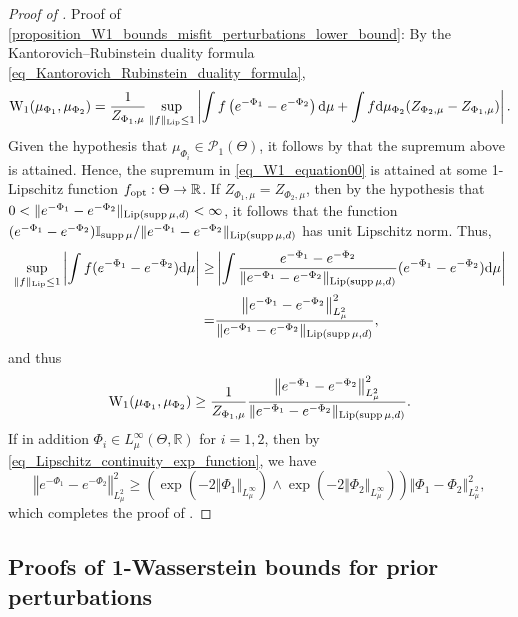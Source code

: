 \documentclass[a4paper]{scrartcl}
\theoremstyle{definition}
\numberwithin{equation}{section}
\newcommand{\R}{\mathbb{R}}
\newcommand{\rd}{\mathrm{d}}
\DeclareMathOperator{\supp}{supp}
\newcommand{\Abs}[1]{\left\vert#1\right\vert}
\newcommand{\norm}[1]{\Vert #1 \Vert}
\newcommand{\Norm}[1]{\left\Vert #1 \right\Vert}
\newcommand{\Lip}[0]{\textup{Lip}}
\newcommand{\Was}[0]{\textup{W}}
\newcommand{\opt}[0]{\textup{opt}}
\begin{document}
\begin{proof}[Proof of ]
 Proof of \cref{proposition_W1_bounds_misfit_perturbations_lower_bound}: By the Kantorovich--Rubinstein duality formula \eqref{eq_Kantorovich_Rubinstein_duality_formula}, 
 \begin{equation*}
 \Was_1(\mu_{\Phi_1},\mu_{\Phi_2})=\frac{1}{Z_{\Phi_1,\mu}}\sup_{\norm{f}_{\Lip}\leq 1}\Abs{ \int f\left(  e^{-\Phi_1}-e^{-\Phi_2}\right)\rd \mu+\int f \rd \mu_{\Phi_2}(Z_{\Phi_2,\mu}-Z_{\Phi_1,\mu}) }.
\end{equation*}
 Given the hypothesis that $\mu_{\Phi_i}\in\mathcal{P}_1(\Theta)$, it follows by  that the supremum above is attained.
 Hence, the supremum in \eqref{eq_W1_equation00} is attained at some 1-Lipschitz function $f_\opt:\Theta\to\R$.
If $Z_{\Phi_1,\mu}=Z_{\Phi_2,\mu}$, then by the hypothesis that $0<\norm{e^{-\Phi_1}-e^{-\Phi_2}}_{\Lip(\supp{\mu},d)}<\infty$, it follows that the function $(e^{-\Phi_1}-e^{-\Phi_2})\mathbb{I}_{\supp{\mu}}/\norm{e^{-\Phi_1}-e^{-\Phi_2}}_{\Lip(\supp{\mu},d)}$ has unit Lipschitz norm.
Thus,
\begin{align*}
 \sup_{\norm{f}_{\Lip}\leq 1} \Abs{ \int f (e^{-\Phi_1}-e^{-\Phi_2})\rd \mu}\geq & \Abs{ \int \frac{e^{-\Phi_1}-e^{-\Phi_2}}{\norm{e^{-\Phi_1}-e^{-\Phi_2}}_{\Lip(\supp{\mu},d)}} (e^{-\Phi_1}-e^{-\Phi_2})\rd \mu}
 \\
 =&\frac{\Norm{e^{-\Phi_1}-e^{-\Phi_2}}_{L^2_\mu}^{2}}{\norm{e^{-\Phi_1}-e^{-\Phi_2}}_{\Lip(\supp{\mu},d)}},
\end{align*}
and thus
\begin{equation*}
 \Was_1(\mu_{\Phi_1},\mu_{\Phi_2})\geq \frac{1}{Z_{\Phi_1,\mu}}\frac{\Norm{e^{-\Phi_1}-e^{-\Phi_2}}_{L^2_\mu}^{2}}{\norm{e^{-\Phi_1}-e^{-\Phi_2}}_{\Lip(\supp{\mu},d)}}.
\end{equation*}
If in addition $\Phi_i\in L^\infty_\mu(\Theta,\R)$ for $i=1,2$, then by \eqref{eq_Lipschitz_continuity_exp_function}, we have 
\begin{equation*}
 \Norm{e^{-\Phi_1}-e^{-\Phi_2}}_{L^2_\mu}^{2}\geq \left(\exp(-2\norm{\Phi_1}_{L^\infty_\mu})\wedge \exp(-2\norm{\Phi_2}_{L^\infty_\mu})\right)\norm{\Phi_1-\Phi_2}_{L^2_\mu}^{2},
\end{equation*}
which completes the proof of .
\end{proof}

\subsection{Proofs of 1-Wasserstein bounds for prior perturbations}
\label{section_W1bounds_prior_perturbations_proofs}
\end{document}
